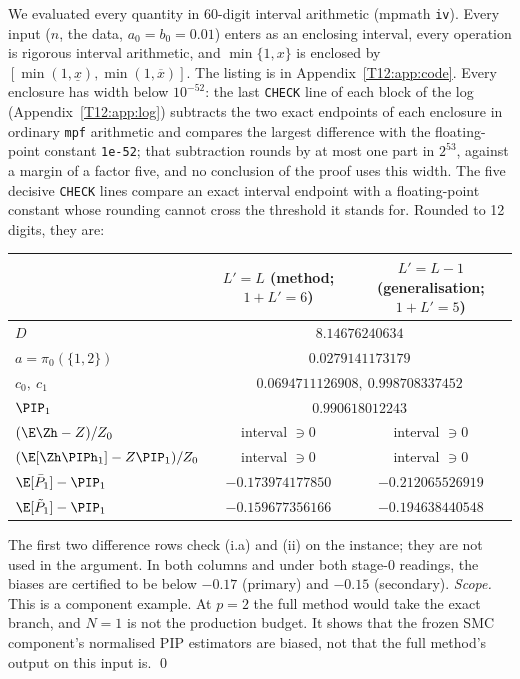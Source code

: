 \documentclass[11pt]{report}
\begin{document}
We evaluated every quantity in 60-digit interval arithmetic (mpmath \texttt{iv}). Every input ($n$, the data, $a_0=b_0=0.01$) enters as an enclosing interval, every operation is rigorous interval arithmetic, and $\min\{1,x\}$ is enclosed by $[\min(1,\underline x),\min(1,\overline x)]$. The listing is in Appendix~\ref{T12:app:code}. Every enclosure has width below $10^{-52}$: the last \texttt{CHECK} line of each block of the log (Appendix~\ref{T12:app:log}) subtracts the two exact endpoints of each enclosure in ordinary \texttt{mpf} arithmetic and compares the largest difference with the floating-point constant \texttt{1e-52}; that subtraction rounds by at most one part in $2^{53}$, against a margin of a factor five, and no conclusion of the proof uses this width. The five decisive \texttt{CHECK} lines compare an exact interval endpoint with a floating-point constant whose rounding cannot cross the threshold it stands for. Rounded to 12 digits, they are:
\begin{center}
\begin{tabular}{lcc}
 & $L'=L$ (method; $1+L'=6$) & $L'=L-1$ (generalisation; $1+L'=5$)\\\hline
$D$ & \multicolumn{2}{c}{$8.14676240634$}\\
$a=\pi_0(\{1,2\})$ & \multicolumn{2}{c}{$0.0279141173179$}\\
$c_0,\ c_1$ & \multicolumn{2}{c}{$0.0694711126908,\ 0.998708337452$}\\
$\PIP_1$ & \multicolumn{2}{c}{$0.990618012243$}\\
$(\E\Zh-Z)/Z_0$ & interval $\ni0$ & interval $\ni0$\\
$(\E[\Zh\PIPh_1]-Z\PIP_1)/Z_0$ & interval $\ni0$ & interval $\ni0$\\
$\E[\bar P_1]-\PIP_1$ & $-0.173974177850$ & $-0.212065526919$\\
$\E[\tilde P_1]-\PIP_1$ & $-0.159677356166$ & $-0.194638440548$\\
\end{tabular}
\end{center}
The first two difference rows check (i.a) and (ii) on the instance; they are not used in the argument. In both columns and under both stage-0 readings, the biases are certified to be below $-0.17$ (primary) and $-0.15$ (secondary). \emph{Scope.} This is a component example. At $p=2$ the full method would take the exact branch, and $N=1$ is not the production budget. It shows that the frozen SMC component's normalised PIP estimators are biased, not that the full method's output on this input is. \qed
\end{document}
